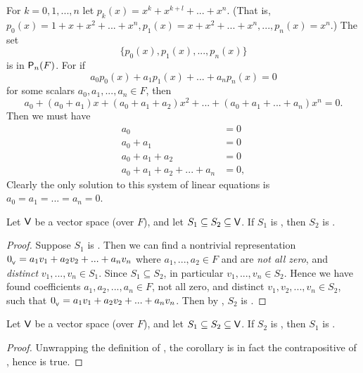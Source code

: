 \begin{example} \label{example 1.5.4}
For \(k = 0, 1, ..., n\) let \(p_k(x) = x^k + x^{k+l} + ... + x^n\).
(That is, \(p_0(x) = 1 + x + x^2 + ... + x^n, p_1(x) = x + x^2 + ... + x^n, ..., p_n(x) = x^n\).)
The set
\[
    \{ p_0(x), p_1(x), ..., p_n(x) \}
\]
is \LID{} in \(\textsf{P}_n(F)\).
For if
\[
    a_0 p_0(x) + a_1 p_1(x) + ... + a_n p_n(x) = 0
\]
for some scalars \(a_0, a_1, ..., a_n \in F\), then
\[
    a_0 + (a_0 + a_1)x + (a_0 + a_1 + a_2)x^2 + ... + (a_0 + a_1 + ... + a_n)x^n = 0.
\]
Then we must have
\begin{align*}
                            a_0 & = 0 \\
                      a_0 + a_1 & = 0 \\
                a_0 + a_1 + a_2 & = 0 \\
    a_0 + a_1 + a_2 + ... + a_n & = 0,
\end{align*}
Clearly the only solution to this system of linear equations is \(a_0 = a_1 = ... = a_n = 0\).
\end{example}

\begin{theorem} \label{thm 1.6}
Let \(\textsf{V}\) be a vector space (over \(F\)), and let \(S_1 \subseteq S_2 \subseteq \textsf{V}\).
If \(S_1\) is \LDP{}, then \(S_2\) is \LDP{}.
\end{theorem}

\begin{proof}
Suppose \(S_1\) is \LDP{}.
Then we can find a nontrivial representation \(0_{_{\textsf{V}}} = a_1 v_1 + a_2 v_2 + ... + a_n v_n\) where \(a_1, ..., a_2 \in F\) and are \emph{not all zero}, and \emph{distinct} \(v_1, ..., v_n \in S_1\).
Since \(S_1 \subseteq S_2\), in particular \(v_1, ..., v_n \in S_2\).
Hence we have found coefficients \(a_1, a_2, ..., a_n \in F\), not all zero, and distinct \(v_1, v_2, ..., v_n \in S_2\), such that \(0_{_{\textsf{V}}} = a_1 v_1 + a_2 v_2 + ... + a_n v_n\).
Then by , \(S_2\) is \LDP{}.
\end{proof}

\begin{corollary} \label{corollary 1.6.1}
Let \(\textsf{V}\) be a vector space (over \(F\)), and let \(S_1 \subseteq S_2 \subseteq \textsf{V}\).
If \(S_2\) is \LID{}, then \(S_1\) is \LID{}.
\end{corollary}

\begin{proof}
Unwrapping the definition of \LID{}, the corollary is in fact the contrapositive of , hence is true.
\end{proof}

